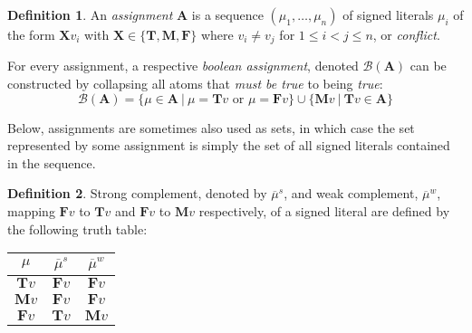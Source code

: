 \documentclass{vutinfth} %
\theoremstyle{example}
\theoremstyle{definition}
\newtheorem{definition}{Definition}[section]
\theoremstyle{theorem}
\theoremstyle{lemma}
\theoremstyle{corollary}
\newtheorem*{remark}{Remark}
\newcommand{\mbt}{must-be-true}
\newcommand{\negstrong}[1]{\overline{#1}^s}
\newcommand{\negweak}[1]{\overline{#1}^w}
\newcommand{\bass}{\mathcal{B}}
\newcommand{\ass}{\mathbf{A}}
\newcommand{\bT}{\mathbf{T}}
\newcommand{\bM}{\mathbf{M}}
\newcommand{\bF}{\mathbf{F}}
\newcommand{\bX}{\mathbf{X}}
\newcommand{\sgl}{\mu}
\newcommand{\bsgl}{\sigma}
\newcommand{\thrice}{{\{\bT, \bM, \bF \}}}
\newcommand{\wkn}{\textit{weaken}}
\begin{document}


\begin{definition}
An \emph{assignment} $\ass$ is a sequence $(\sgl_1, \ldots, \sgl_n)$ of signed literals $\sgl_i$ of the form $\bX v_i$ with $\bX \in \thrice$ where $v_i \not = v_j$ for $1 \leq i < j \leq n$, or \emph{conflict}.

For every assignment, a respective \emph{boolean assignment}, denoted $\bass(\ass)$ can be constructed by collapsing all atoms that \emph{must be true} to being \emph{true}:$$\bass(\ass) = \{ \sgl \in \ass \ | \ \sgl = \bT v \textrm{ or } \sgl = \bF v \} \cup \{ \bM v \ | \ \bT v \in \ass \}$$
\end{definition}

Below, assignments are sometimes also used as sets, in which case the set represented by some assignment is simply the set of all signed literals contained in the sequence.

\begin{definition}
Strong complement, denoted by $\negstrong{\sgl}$, and weak complement, $\negweak{\sgl}$, mapping $\bF v$ to $\bT v$ and $\bF v$ to $\bM v$ respectively, of a signed literal are defined by the following truth table:%

\begin{center}
\begin{tabular}{|c|cc|}
\hline
$\sgl$&$\negstrong{\sgl}$&$\negweak{\sgl}$\\
\hline
\hline
$\bT v$&$\bF v$&$\bF v$\\
$\bM v$&$\bF v$&$\bF v$\\
$\bF v$&$\bT v$&$\bM v$\\
\hline
\end{tabular}
\end{center}
\end{definition}
\end{document}
